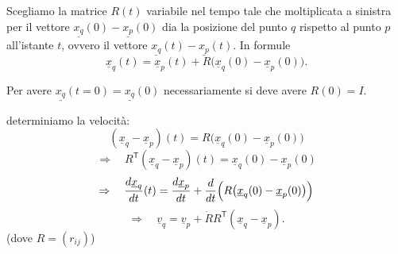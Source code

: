 Scegliamo la matrice $R(t)$ variabile nel tempo tale che moltiplicata a sinistra per  il vettore $\underline{x_q}(0) - \underline{x_p}(0)$ dia la posizione del punto $q$ rispetto al punto $p$ all'istante $t$, ovvero il vettore $\underline{x_q}(t) - \underline{x_p}(t)$. In formule
\[
\underline{x}_q(t)=\underline{x}_p(t)+R\bigl(\underline{x}_q(0)-\underline{x}_p(0)\bigr).
\]

\begin{oss}{}
    Per avere $\underline{x_q}(t = 0) = \underline{x_q}(0)$ necessariamente si deve avere $R(0) = I$.
\end{oss}

\begin{center}
\end{center}

determiniamo la velocità:
\[
(\underline{x}_q-\underline{x}_p)(t)=R\bigl(\underline{x}_q(0)-\underline{x}_p(0)\bigr)
\]
\[
\Rightarrow\quad
R^{\mathsf T}(\underline{x}_q-\underline{x}_p)(t)=\underline{x}_q(0)-\underline{x}_p(0)
\]
\[
\Rightarrow\quad
\frac{d\underline{x}_q}{dt}(t)=\frac{d\underline{x}_p}{dt}+\frac{d}{dt}\Bigl(R\bigl(\underline{x}_q(0)-\underline{x}_p(0)\bigr)\Bigr)
\]
\[
\Rightarrow\quad
\underline{v}_q=\underline{v}_p+\dot{R}R^{\mathsf T}(\underline{x}_q-\underline{x}_p).
\]
(dove $R=(r_{ij})$)

\medskip

